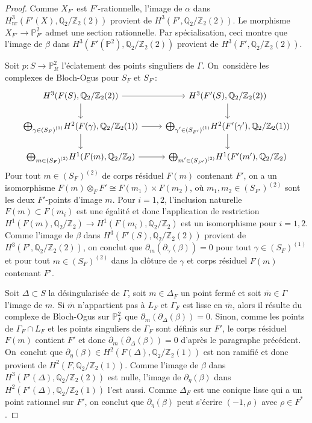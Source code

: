 \documentclass[11pt]{article}
\theoremstyle{definition}
\newcommand{\Q}{\mathbb Q}
\newcommand{\Z}{\mathbb Z}
\renewcommand{\P}{\mathbb P}
\newcommand{\cl}{\overline}
\newcommand{\on}[1]{\operatorname{#1}}
\begin{document}
\begin{proof}
Comme $X_{F'}$ est $F'$-rationnelle, l'image de $\alpha$ dans $H^3_{\on{nr}}(F'(X),\Q_2/\Z_2(2))$ provient de $H^3(F',\Q_2/\Z_2(2))$. Le morphisme $X_{F'}\to \P^2_{F'}$ admet une section rationnelle. Par spécialisation, ceci montre que l'image de $\beta$ dans $H^3(F'(\P^2),\Q_2/\Z_2(2))$ provient de $H^3(F',\Q_2/\Z_2(2))$.

Soit $p \colon S \to \P^2_{R}$ l'éclatement des points singuliers de $\Gamma$. On~considère les complexes de Bloch-Ogus pour $S_F$ et $S_{F'}$:
\[
\begin{tikzcd}
H^3(F(S),\Q_2/\Z_2(2))\arrow[r] \arrow[d] & H^3(F'(S),\Q_2/\Z_2(2)) \arrow[d] \\
{\smash{\bigoplus_{\substack{\gamma\in (S_F)^{(1)}}}} H^2(F(\gamma),\Q_2/\Z_2(1))} \arrow[r] \arrow[d] &
{\smash{\bigoplus_{\substack{\gamma'\in (S_{F'})^{(1)}}}} H^2(F'(\gamma'),\Q_2/\Z_2(1))} \arrow[d] \\
{\smash{\bigoplus_{\substack{m\in (S_F)^{(2)}}}} H^1(F(m),\Q_2/\Z_2)} \arrow[r] &
{\smash{\bigoplus_{\substack{m'\in (S_{F'})^{(2)}}}} H^1(F'(m'),\Q_2/\Z_2)}
\end{tikzcd}
\]
Pour tout $m\in (S_F)^{(2)}$ de corps résiduel $F(m)$ contenant $F'$, on a un isomorphisme $F(m)\otimes_F F'\cong F(m_1)\times F(m_2)$, où $m_1,m_2\in (S_{F'})^{(2)}$ sont les deux $F'$-points d'image $m$. Pour $i=1,2$, l'inclusion naturelle $F(m)\subset F(m_i)$ est une égalité et donc l'application de restriction $H^1(F(m),\Q_2/\Z_2)\to H^1(F(m_i),\Q_2/\Z_2)$ est un isomorphisme pour $i=1,2$. Comme l'image de $\beta$ dans $H^3(F'(S),\Q_2/\Z_2(2))$ provient de $H^3(F',\Q_2/\Z_2(2))$, on conclut que $\partial_m(\partial_\gamma(\beta))=0$ pour tout $\gamma\in (S_F)^{(1)}$ et pour tout $m\in (S_F)^{(2)}$ dans la clôture de $\gamma$ et corps résiduel $F(m)$ contenant $F'$.

Soit $\Delta \subset S$ la désingularisée de $\Gamma$, soit $m\in \Delta_F$ un point fermé et soit $\cl{m}\in \Gamma$ l'image de $m$. Si $\cl{m}$ n'appartient pas à $L_F$ et $\Gamma_F$ est lisse en $\cl{m}$, alors il résulte du complexe de Bloch-Ogus sur $\P^2_F$ que $\partial_m(\partial_\Delta(\beta))=0$. Sinon, comme les points de $\Gamma_F\cap L_F$ et les points singuliers de $\Gamma_F$ sont définis sur $F'$, le corps résiduel $F(m)$ contient $F'$ et donc $\partial_m(\partial_\Delta(\beta))=0$ d'après le paragraphe précédent. On~conclut que $\partial_{\eta}(\beta) \in H^2(F(\Delta),\Q_2/\Z_2(1))$ est non ramifié et donc provient de $H^2(F,\Q_2/\Z_2(1))$. Comme l'image de $\beta$ dans $H^3(F'(\Delta),\Q_2/\Z_2(2))$ est nulle, l'image de $\partial_{\eta}(\beta)$ dans $H^2(F'(\Delta),\Q_2/\Z_2(1))$ l'est aussi. Comme $\Delta_{F}$ est une conique lisse qui a un point rationnel sur $F'$, on conclut que $\partial_{\eta}(\beta)$ peut s'écrire $(-1,\rho)$ avec $\rho \in F^*$.


\end{proof}
\end{document}
